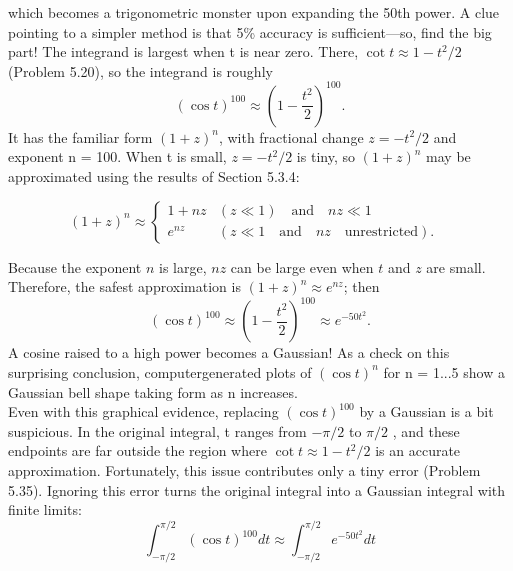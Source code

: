 \documentclass{book}
\newcounter{pro1}
\begin{document}
\Large \textrm{which becomes a trigonometric monster upon expanding the 50th power. 
A clue pointing to a simpler method is that 5\% accuracy is sufficient—so, 
find the big part! The integrand is largest when t is near zero. There,
$\cot t \approx 1-t^{2}/2$ (Problem 5.20), so the integrand is roughly}
\begin{equation}
(\cos t)^{100}\approx \left (1- \frac{t^{2}}{2} \right )^{100} . 
\end{equation}
\Large\textrm{It has the familiar form $(1 + z)^{n}$, with fractional change $z = −t^{2}/2$ and 
exponent n = 100. When t is small, $z = −t^{2}/2$ is tiny, so $(1 + z)^{n}$ may be 
approximated using the results of Section 5.3.4:}
\begin{flushleft}
\begin{equation}
 (1+z)^{n}\approx \left\{\begin{matrix} 1+nz &  (z\ll 1) \quad \textrm{and} \quad nz\ll 1 &\\ e ^{nz}& (z\ll 1 \quad \textrm{and} \quad nz \quad \textrm{unrestricted}) .& \end{matrix}\right.  
\end{equation}
\end{flushleft}
\Large \textrm{Because the exponent $n$ is large, $nz$ can be large even when $t$ and $z$ are 
small. Therefore, the safest approximation is $(1 + z)^{n}\approx e ^{nz}$; then} 
\begin{equation}
(\cos t)^{100}\approx \left (1- \frac{t^{2}}{2} \right )^{100} \approx e ^{-50t^{2}} .
\end{equation}
\Large\textrm{A cosine raised to a high power becomes a Gaussian! 
As a check on this surprising conclusion, computergenerated plots of $(\cos t)^{n}$ for n = 1...5 show a 
Gaussian bell shape taking form as n increases. \\
Even with this graphical evidence, replacing $(\cos t)^{100}$ by a Gaussian is a 
bit suspicious. In the original integral, t ranges from $-\pi /2$ to $\pi /2$ , and 
these endpoints are far outside the region where $\cot t \approx 1-t^{2}/2$ is an 
accurate approximation. Fortunately, this issue contributes only a tiny 
error (Problem 5.35). Ignoring this error turns the original integral into a 
Gaussian integral with finite limits: } 
\begin{equation}
\int_{-\pi /2}^{\pi /2}(\cos t)^{100}dt \approx \int_{-\pi /2}^{\pi /2} e ^{-50t^{2}}dt
\end{equation}


\newpage 
\pagestyle{fancy} 
\renewcommand{\headrulewidth}{0pt} 
\fancyhf{} %
\end{document}
